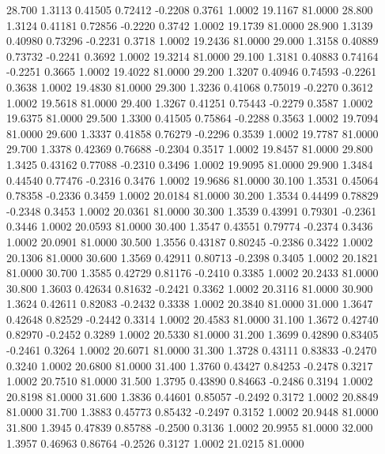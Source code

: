   28.700   1.3113   0.41505   0.72412  -0.2208   0.3761   1.0002  19.1167  81.0000
  28.800   1.3124   0.41181   0.72856  -0.2220   0.3742   1.0002  19.1739  81.0000
  28.900   1.3139   0.40980   0.73296  -0.2231   0.3718   1.0002  19.2436  81.0000
  29.000   1.3158   0.40889   0.73732  -0.2241   0.3692   1.0002  19.3214  81.0000
  29.100   1.3181   0.40883   0.74164  -0.2251   0.3665   1.0002  19.4022  81.0000
  29.200   1.3207   0.40946   0.74593  -0.2261   0.3638   1.0002  19.4830  81.0000
  29.300   1.3236   0.41068   0.75019  -0.2270   0.3612   1.0002  19.5618  81.0000
  29.400   1.3267   0.41251   0.75443  -0.2279   0.3587   1.0002  19.6375  81.0000
  29.500   1.3300   0.41505   0.75864  -0.2288   0.3563   1.0002  19.7094  81.0000
  29.600   1.3337   0.41858   0.76279  -0.2296   0.3539   1.0002  19.7787  81.0000
  29.700   1.3378   0.42369   0.76688  -0.2304   0.3517   1.0002  19.8457  81.0000
  29.800   1.3425   0.43162   0.77088  -0.2310   0.3496   1.0002  19.9095  81.0000
  29.900   1.3484   0.44540   0.77476  -0.2316   0.3476   1.0002  19.9686  81.0000
  30.100   1.3531   0.45064   0.78358  -0.2336   0.3459   1.0002  20.0184  81.0000
  30.200   1.3534   0.44499   0.78829  -0.2348   0.3453   1.0002  20.0361  81.0000
  30.300   1.3539   0.43991   0.79301  -0.2361   0.3446   1.0002  20.0593  81.0000
  30.400   1.3547   0.43551   0.79774  -0.2374   0.3436   1.0002  20.0901  81.0000
  30.500   1.3556   0.43187   0.80245  -0.2386   0.3422   1.0002  20.1306  81.0000
  30.600   1.3569   0.42911   0.80713  -0.2398   0.3405   1.0002  20.1821  81.0000
  30.700   1.3585   0.42729   0.81176  -0.2410   0.3385   1.0002  20.2433  81.0000
  30.800   1.3603   0.42634   0.81632  -0.2421   0.3362   1.0002  20.3116  81.0000
  30.900   1.3624   0.42611   0.82083  -0.2432   0.3338   1.0002  20.3840  81.0000
  31.000   1.3647   0.42648   0.82529  -0.2442   0.3314   1.0002  20.4583  81.0000
  31.100   1.3672   0.42740   0.82970  -0.2452   0.3289   1.0002  20.5330  81.0000
  31.200   1.3699   0.42890   0.83405  -0.2461   0.3264   1.0002  20.6071  81.0000
  31.300   1.3728   0.43111   0.83833  -0.2470   0.3240   1.0002  20.6800  81.0000
  31.400   1.3760   0.43427   0.84253  -0.2478   0.3217   1.0002  20.7510  81.0000
  31.500   1.3795   0.43890   0.84663  -0.2486   0.3194   1.0002  20.8198  81.0000
  31.600   1.3836   0.44601   0.85057  -0.2492   0.3172   1.0002  20.8849  81.0000
  31.700   1.3883   0.45773   0.85432  -0.2497   0.3152   1.0002  20.9448  81.0000
  31.800   1.3945   0.47839   0.85788  -0.2500   0.3136   1.0002  20.9955  81.0000
  32.000   1.3957   0.46963   0.86764  -0.2526   0.3127   1.0002  21.0215  81.0000
